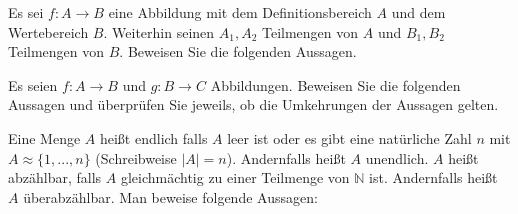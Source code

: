 \documentclass[10pt, a4paper]{exam}
\begin{document}
\begin{questions}
    \question Es sei $f:A\rightarrow B$ eine Abbildung mit dem Definitionsbereich $A$ und dem Wertebereich $B$. Weiterhin seinen $A_1,A_2$ Teilmengen von $A$ und $B_1,B_2$ Teilmengen von $B$. Beweisen Sie die folgenden Aussagen.

    \question Es seien $f:A\rightarrow B$ und $g:B\rightarrow C$ Abbildungen. Beweisen Sie die folgenden Aussagen und überprüfen Sie jeweils, ob die Umkehrungen der Aussagen gelten.

    \question Eine Menge $A$ heißt endlich falls $A$ leer ist oder es gibt eine natürliche Zahl $n$ mit $A\approx\{1, ..., n\}$ (Schreibweise $|A| = n$). Andernfalls heißt $A$ unendlich. $A$ heißt abzählbar, falls $A$ gleichmächtig zu einer Teilmenge von $\mathbb{N}$ ist. Andernfalls heißt $A$ überabzählbar. Man beweise folgende Aussagen:
    \begin{parts}

\end{parts}
\end{questions}
\end{document}
